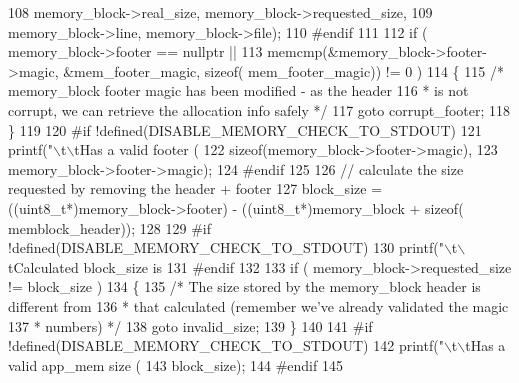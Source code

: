 \begin{DoxyCode}
{{{{{108                 memory\_block->real_size, memory\_block->requested_size,
109                 memory\_block->line, memory\_block->file);
110 \textcolor{preprocessor}{#endif
}
111 \textcolor{preprocessor}{}
112         \textcolor{keywordflow}{if} ( memory\_block->footer == \textcolor{keyword}{nullptr} ||
113                 memcmp(&memory\_block->footer->magic, &mem_footer_magic, \textcolor{keyword}{sizeof}(
      mem_footer_magic)) != 0 )
114         \{
115                 \textcolor{comment}{/* memory\_block footer magic has been modified - as the header
}
116 \textcolor{comment}{                 * is not corrupt, we can retrieve the allocation info safely */}
117                 \textcolor{keywordflow}{goto} corrupt\_footer;
118         \}
119 
120 \textcolor{preprocessor}{#if !defined(DISABLE\_MEMORY\_CHECK\_TO\_STDOUT)
}
121 \textcolor{preprocessor}{}        printf(\textcolor{stringliteral}{"\(\backslash\)t\(\backslash\)tHas a valid footer (%
122                 \textcolor{keyword}{sizeof}(memory\_block->footer->magic),
123                 memory\_block->footer->magic);
124 \textcolor{preprocessor}{#endif
}
125 \textcolor{preprocessor}{}
126         \textcolor{comment}{// calculate the size requested by removing the header + footer}
127         block\_size = ((uint8\_t*)memory\_block->footer) - ((uint8\_t*)memory\_block + \textcolor{keyword}{sizeof}(
      memblock_header));
128 
129 \textcolor{preprocessor}{#if !defined(DISABLE\_MEMORY\_CHECK\_TO\_STDOUT)
}
130 \textcolor{preprocessor}{}        printf(\textcolor{stringliteral}{"\(\backslash\)t\(\backslash\)tCalculated block\_size is %
131 \textcolor{preprocessor}{#endif
}
132 \textcolor{preprocessor}{}
133         \textcolor{keywordflow}{if} ( memory\_block->requested_size != block\_size )
134         \{
135                 \textcolor{comment}{/* The size stored by the memory\_block header is different from
}
136 \textcolor{comment}{                 * that calculated (remember we've already validated the magic
}
137 \textcolor{comment}{                 * numbers) */}
138                 \textcolor{keywordflow}{goto} invalid\_size;
139         \}
140 
141 \textcolor{preprocessor}{#if !defined(DISABLE\_MEMORY\_CHECK\_TO\_STDOUT)
}
142 \textcolor{preprocessor}{}        printf(\textcolor{stringliteral}{"\(\backslash\)t\(\backslash\)tHas a valid app\_mem size (%
143                block\_size);
144 \textcolor{preprocessor}{#endif
}
145 \textcolor{preprocessor}{}
}}}}}}}}
\end{DoxyCode}
